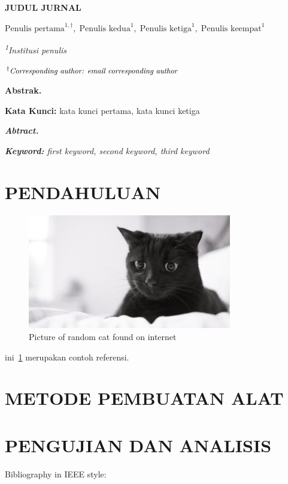 \documentclass[11pt, a4paper]{article}
\begin{document}
\begin{center}
    {\textbf{\Large JUDUL JURNAL}}\par
    \vspace{12pt}
    $\text{Penulis pertama}^{1, \dagger},\;\text{Penulis kedua}^1,\;\text{Penulis ketiga}^1,\;\text{Penulis keempat}^1$\par
    \vspace{11pt}
    {\textit{\small \textsuperscript{1}Institusi penulis}}\par
    $^\dagger \text{{\textit{\small Corresponding author: email corresponding author}}}$
\end{center}
\vspace{11pt}
\noindent \textbf{Abstrak.} \lipsum[1]\par
\vspace{11pt}
\noindent \textbf{Kata Kunci:} kata kunci pertama, kata kunci ketiga\par
\vspace{11pt}
\noindent \textit{\textbf{Abtract.} \lipsum[1]}\par
\vspace{11pt}
\noindent \textit{\textbf{Keyword:} first keyword, second keyword, third keyword}\par

\section{PENDAHULUAN}
\begin{figure}[H]
    \centering
    \includegraphics[height=5cm]{random-cat}
    \caption{Picture of random cat found on internet}\label{gambar:random-cat}
\end{figure}
ini~\cref{gambar:random-cat} merupakan contoh referensi.
\lipsum[1]
\section{METODE PEMBUATAN ALAT}
\lipsum[1]
\section{PENGUJIAN DAN ANALISIS}
Bibliography in IEEE style:
\end{document}
